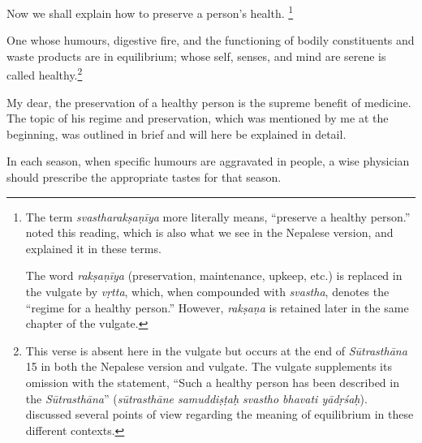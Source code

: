 \begin{translation}    
  
\item [1] 
Now we shall explain how to preserve a person's health.%
	\footnote{The term \emph{svastharakṣaṇīya} more literally means, ``preserve a healthy person.''  noted this reading, which is also what we see in the Nepalese version, and explained it in these terms.
    
    The word \emph{rakṣaṇīya} (preservation, maintenance, upkeep, etc.) is replaced in the vulgate \citep[808]{vulgate} by \emph{vṛtta}, which, when compounded with \emph{svastha}, denotes the “regime for a healthy person.” However, \emph{rakṣaṇa} is retained later in the same chapter of the vulgate.} 

\item [2] 
One whose humours, digestive fire, and the functioning of bodily constituents and waste products are in equilibrium; whose self, senses, and mind are serene is called healthy.\footnote{This verse is absent here in the vulgate but occurs at the end of \emph{Sūtrasthāna} 15 in both the Nepalese version and vulgate. The vulgate \citep[808]{vulgate} supplements its omission with the statement, ``Such a healthy person has been described in the \emph{Sūtrasthāna}'' (\emph{sūtrasthāne samuddiṣṭaḥ svastho bhavati yādṛśaḥ}).  discussed several points of view
regarding the meaning of equilibrium in these different 
contexts.}

\item [3] 
My dear, the preservation of a healthy person is the supreme benefit of medicine. The topic of his regime and preservation, which was mentioned by me at the beginning, was outlined in brief and will here be explained in detail.

\item [4] 
In each season, when specific humours are aggravated in people, a wise physician should prescribe the appropriate tastes for that season.


\end{translation}
